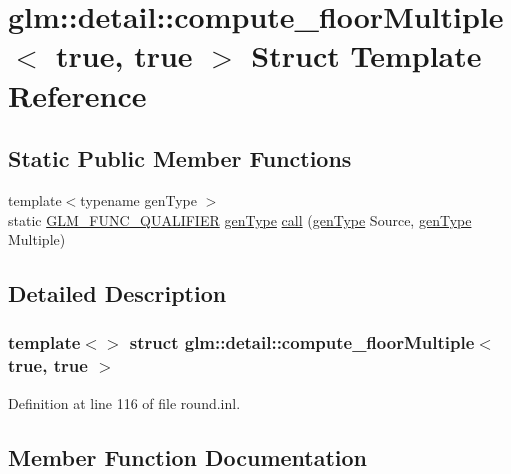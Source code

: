 \hypertarget{structglm_1_1detail_1_1compute__floor_multiple_3_01true_00_01true_01_4}{}\section{glm\+::detail\+::compute\+\_\+floor\+Multiple$<$ true, true $>$ Struct Template Reference}
\label{structglm_1_1detail_1_1compute__floor_multiple_3_01true_00_01true_01_4}
\subsection*{Static Public Member Functions}
\begin{DoxyCompactItemize}
\item 
{\footnotesize template$<$typename gen\+Type $>$ }\\static \mbox{\hyperlink{setup_8hpp_a33fdea6f91c5f834105f7415e2a64407}{G\+L\+M\+\_\+\+F\+U\+N\+C\+\_\+\+Q\+U\+A\+L\+I\+F\+I\+ER}} \mbox{\hyperlink{structglm_1_1detail_1_1gen_type}{gen\+Type}} \mbox{\hyperlink{structglm_1_1detail_1_1compute__floor_multiple_3_01true_00_01true_01_4_a18fef0ea82a4549501b832f4571ab1c5}{call}} (\mbox{\hyperlink{structglm_1_1detail_1_1gen_type}{gen\+Type}} Source, \mbox{\hyperlink{structglm_1_1detail_1_1gen_type}{gen\+Type}} Multiple)
\end{DoxyCompactItemize}


\subsection{Detailed Description}
\subsubsection*{template$<$$>$\newline
struct glm\+::detail\+::compute\+\_\+floor\+Multiple$<$ true, true $>$}



Definition at line 116 of file round.\+inl.



\subsection{Member Function Documentation}
\mbox{\label{structglm_1_1detail_1_1compute__floor_multiple_3_01true_00_01true_01_4_a18fef0ea82a4549501b832f4571ab1c5}} 
